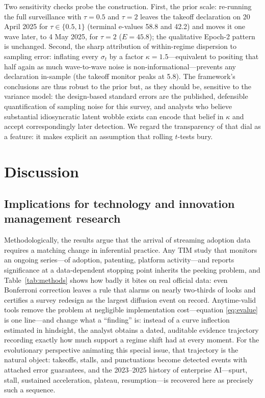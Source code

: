 \documentclass[review,authoryear,12pt]{elsarticle}
\begin{document}
Two sensitivity checks probe the construction. First, the prior scale: re-running the full surveillance with $\tau = 0.5$ and $\tau = 2$ leaves the takeoff declaration on 20 April 2025 for $\tau \in \{0.5, 1\}$ (terminal e-values 58.8 and 42.2) and moves it one wave later, to 4 May 2025, for $\tau = 2$ ($E = 45.8$); the qualitative Epoch-2 pattern is unchanged. Second, the sharp attribution of within-regime dispersion to sampling error: inflating every $\sigma_t$ by a factor $\kappa = 1.5$---equivalent to positing that half again as much wave-to-wave noise is non-informational---prevents any declaration in-sample (the takeoff monitor peaks at 5.8). The framework's conclusions are thus robust to the prior but, as they should be, sensitive to the variance model: the design-based standard errors are the published, defensible quantification of sampling noise for this survey, and analysts who believe substantial idiosyncratic latent wobble exists can encode that belief in $\kappa$ and accept correspondingly later detection. We regard the transparency of that dial as a feature: it makes explicit an assumption that rolling $t$-tests bury.

\section{Discussion}
\label{sec:discussion}

\subsection{Implications for technology and innovation management research}

Methodologically, the results argue that the arrival of streaming adoption data requires a matching change in inferential practice. Any TIM study that monitors an ongoing series---of adoption, patenting, platform activity---and reports significance at a data-dependent stopping point inherits the peeking problem, and Table~\ref{tab:methods} shows how badly it bites on real official data: even Bonferroni correction leaves a rule that alarms on nearly two-thirds of looks and certifies a survey redesign as the largest diffusion event on record. Anytime-valid tools remove the problem at negligible implementation cost---equation \eqref{eq:evalue} is one line---and change what a ``finding'' is: instead of a curve inflection estimated in hindsight, the analyst obtains a dated, auditable evidence trajectory recording exactly how much support a regime shift had at every moment. For the evolutionary perspective animating this special issue, that trajectory is the natural object: takeoffs, stalls, and punctuations become detected events with attached error guarantees, and the 2023--2025 history of enterprise AI---spurt, stall, sustained acceleration, plateau, resumption---is recovered here as precisely such a sequence.
\end{document}
